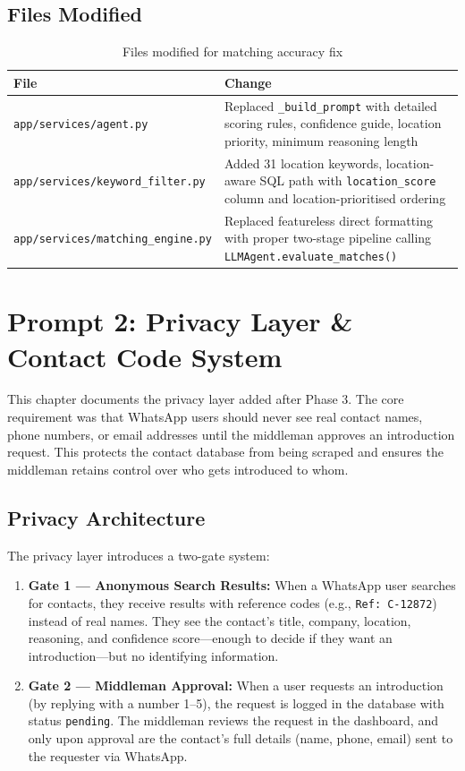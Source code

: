 \documentclass[12pt, a4paper]{report}
\begin{document}
\section{Files Modified}

\begin{table}[H]
\centering
\begin{tabular}{p{5cm}p{8cm}}
\toprule
\textbf{File} & \textbf{Change} \\
\midrule
\texttt{app/services/agent.py} & Replaced \texttt{\_build\_prompt} with detailed scoring rules, confidence guide, location priority, minimum reasoning length \\
\texttt{app/services/keyword\_filter.py} & Added 31 location keywords, location-aware SQL path with \texttt{location\_score} column and location-prioritised ordering \\
\texttt{app/services/matching\_engine.py} & Replaced featureless direct formatting with proper two-stage pipeline calling \texttt{LLMAgent.evaluate\_matches()} \\
\bottomrule
\end{tabular}
\caption{Files modified for matching accuracy fix}
\end{table}

\chapter{Prompt 2: Privacy Layer \& Contact Code System}

This chapter documents the privacy layer added after Phase 3. The core requirement was that WhatsApp users should never see real contact names, phone numbers, or email addresses until the middleman approves an introduction request. This protects the contact database from being scraped and ensures the middleman retains control over who gets introduced to whom.

\section{Privacy Architecture}

The privacy layer introduces a two-gate system:

\begin{enumerate}[itemsep=3pt]
    \item \textbf{Gate 1 --- Anonymous Search Results:} When a WhatsApp user searches for contacts, they receive results with reference codes (e.g., \texttt{Ref: C-12872}) instead of real names. They see the contact's title, company, location, reasoning, and confidence score---enough to decide if they want an introduction---but no identifying information.
    \item \textbf{Gate 2 --- Middleman Approval:} When a user requests an introduction (by replying with a number 1--5), the request is logged in the database with status \texttt{pending}. The middleman reviews the request in the dashboard, and only upon approval are the contact's full details (name, phone, email) sent to the requester via WhatsApp.
\end{enumerate}
\end{document}
